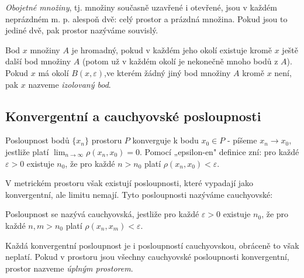 \begin{definition}\textit{Obojetné množiny}, tj. množiny současně uzavřené i otevřené, jsou v každém neprázdném m. p. alespoň dvě: celý prostor a prázdná množina. Pokud jsou to jediné dvě, pak prostor nazýváme souvislý. 
\end{definition}
\begin{definition}
Bod $x$ množiny $A$ je hromadný, pokud v každém jeho okolí existuje kromě $x$ ještě další bod množiny $A$ (potom už v každém okolí je nekonečně mnoho bodů z $A$). Pokud $x$ má okolí $B(x,\varepsilon)$,ve kterém žádný jiný bod množiny $A$ kromě $x$ není, pak $x$ nazveme \textit{izolovaný bod}.
\end{definition}
\subsection{Konvergentní a cauchyovské posloupnosti}
\begin{definition}
Posloupnost bodů $\{x_n\}$ prostoru $P$ konverguje k bodu $x_0 \in P$ - píšeme $x_n \rightarrow x_0$,
jestliže platí $\lim_{n\rightarrow\infty} \rho(x_n, x_0) = 0$. Pomocí „epsilon-en" definice zní: pro každé $\varepsilon > 0$ existuje $n_0$, že pro každé $n>n_0$ platí $\rho(x_n,x_0)<\varepsilon$. 
\end{definition}
V metrickém prostoru však existují posloupnosti, které vypadají jako konvergentní, ale limitu nemají. Tyto posloupnosti nazýváme cauchyovské: 
\begin{definition}
Posloupnost se nazývá cauchyovská, jestliže pro každé $\varepsilon>0$ existuje $n_0$, že pro každé $n, m > n_0$ platí $\rho(x_n,x_m)<\varepsilon$. 
\end{definition}
Každá konvergentní posloupnost je i posloupností cauchyovskou, obráceně to však neplatí.
Pokud v prostoru jsou všechny cauchyovské posloupnosti konvergentní, prostor nazveme
\textit{úplným prostorem}.

